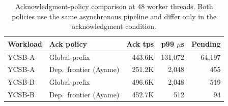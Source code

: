 \begin{table}[t]
  \centering
  \caption{Acknowledgment-policy comparison at 48 worker threads.  Both policies use the same asynchronous pipeline and differ only in the acknowledgment condition.}
  \label{tab:ack-policy}
  \small
  \begin{tabular}{llrrr}
    \hline
    Workload & Ack policy & Ack tps & p99 $\mu$s & Pending \\
    \hline
    YCSB-A & Global-prefix & 443.6K & 131,072 & 64,197 \\
    YCSB-A & Dep.\ frontier (Ayame) & 251.2K & 2,048 & 455 \\
    YCSB-B & Global-prefix & 496.6K & 2,048 & 519 \\
    YCSB-B & Dep.\ frontier (Ayame) & 452.7K & 512 & 94 \\
    \hline
  \end{tabular}
\end{table}
